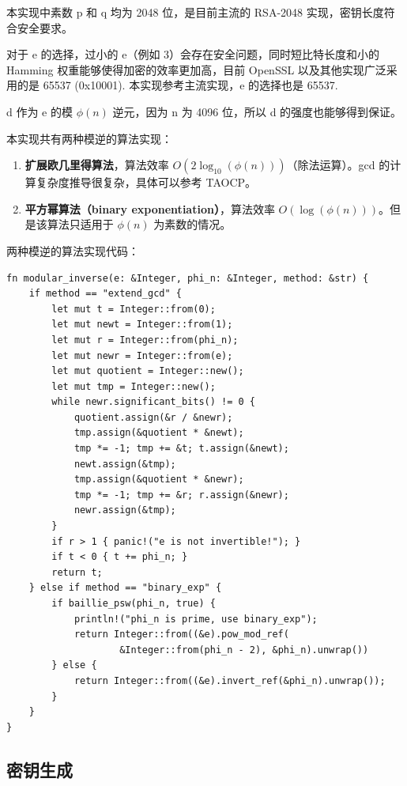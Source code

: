\documentclass[degree=project,degree-type=project,cjk-font=windows]{thuthesis}
\begin{document}
本实现中素数 p 和 q 均为 2048 位，是目前主流的 RSA-2048 实现，密钥长度符合安全要求。

对于 e 的选择，过小的 e（例如 3）会存在安全问题，同时短比特长度和小的 Hamming 权重能够使得加密的效率更加高，目前 OpenSSL 以及其他实现广泛采用的是 65537 (0x10001).
本实现参考主流实现，e 的选择也是 65537.

d 作为 e 的模 $\phi(n)$ 逆元，因为 n 为 4096 位，所以 d 的强度也能够得到保证。

本实现共有两种模逆的算法实现：

\begin{enumerate}
  \item \textbf{扩展欧几里得算法}，算法效率 $O(2 \log_{10}(\phi(n)))$（除法运算）。gcd 的计算复杂度推导很复杂，具体可以参考 TAOCP。
  \item \textbf{平方幂算法（binary exponentiation）}，算法效率 $O(\log(\phi(n)))$。但是该算法只适用于 $\phi(n)$ 为素数的情况。
\end{enumerate}

两种模逆的算法实现代码：

  \begin{verbatim}
fn modular_inverse(e: &Integer, phi_n: &Integer, method: &str) {
    if method == "extend_gcd" {
        let mut t = Integer::from(0);
        let mut newt = Integer::from(1);
        let mut r = Integer::from(phi_n);
        let mut newr = Integer::from(e);
        let mut quotient = Integer::new();
        let mut tmp = Integer::new();
        while newr.significant_bits() != 0 {
            quotient.assign(&r / &newr);
            tmp.assign(&quotient * &newt);
            tmp *= -1; tmp += &t; t.assign(&newt);
            newt.assign(&tmp);
            tmp.assign(&quotient * &newr);
            tmp *= -1; tmp += &r; r.assign(&newr);
            newr.assign(&tmp);
        }
        if r > 1 { panic!("e is not invertible!"); }
        if t < 0 { t += phi_n; }
        return t;
    } else if method == "binary_exp" {
        if baillie_psw(phi_n, true) {
            println!("phi_n is prime, use binary_exp");
            return Integer::from((&e).pow_mod_ref(
                    &Integer::from(phi_n - 2), &phi_n).unwrap())
        } else {
            return Integer::from((&e).invert_ref(&phi_n).unwrap());
        }
    }
}
  \end{verbatim}

\subsection{密钥生成}
\end{document}
